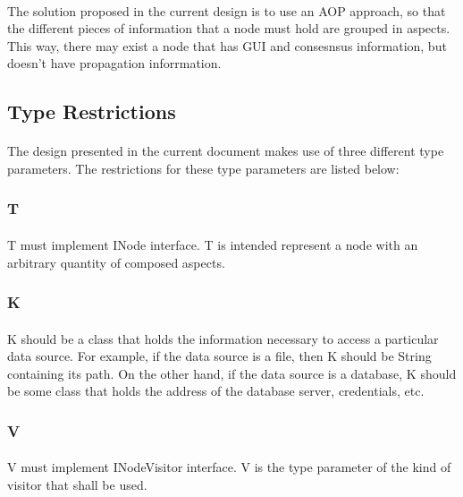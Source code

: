 \documentclass[a4paper,10pt]{article}
\begin{document}
\paragraph{}
The solution proposed in the current design is to use an AOP approach, so that the different pieces of information that a node must hold are grouped in aspects. This way, there may exist a node that has GUI and consesnsus information, but doesn't have propagation inforrmation.

\subsection{Type Restrictions}

\paragraph{}
The design presented in the current document makes use of three different type parameters. The restrictions for these type parameters are listed below:

\subsubsection{T}
\paragraph{}
T must implement INode interface. T is intended represent a node with an arbitrary quantity of composed aspects.

\subsubsection{K}

\paragraph{}
K should be a class that holds the information necessary to access a particular data source. For example, if the data source is a file, then K should be String containing its path. On the other hand, if the data source is a database, K should be some class that holds the address of the database server, credentials, etc.

\subsubsection{V}

\paragraph{}
V must implement INodeVisitor interface. V is the type parameter of the kind of visitor that shall be used.
\end{document}
